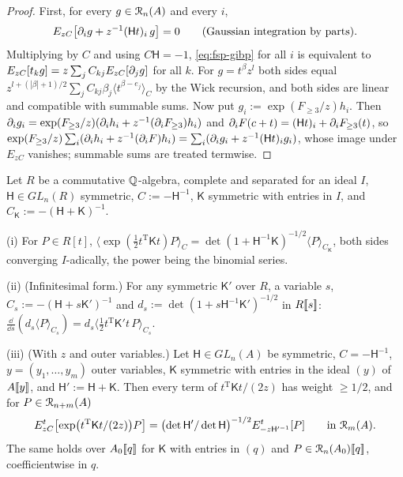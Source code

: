 \begin{proof}
First, for every $g\in\mathcal{R}_n(A)$ and every $i$,
\begin{equation}
\label{eq:fsp-gibp}
E_{zC}\bigl[\partial_ig+z^{-1}(\mathsf Ht)_i\,g\bigr]=0\qquad\text{(Gaussian integration by parts).}
\end{equation}
Multiplying by $C$ and using $C\mathsf H=-1$, \eqref{eq:fsp-gibp} for all $i$ is equivalent to $E_{zC}[t_kg]=z\sum_jC_{kj}E_{zC}[\partial_jg]$ for all $k$. For $g=t^\beta z^l$ both sides equal $z^{l+(|\beta|+1)/2}\sum_jC_{kj}\beta_j\langle t^{\beta-e_j}\rangle_C$ by the Wick recursion, and both sides are linear and compatible with summable sums. Now put $g_i:=\exp(F_{\geq3}/z)h_i$. Then $\partial_ig_i=\exp(F_{\geq3}/z)(\partial_ih_i+z^{-1}(\partial_iF_{\geq3})h_i)$ and $\partial_iF(c+t)=(\mathsf Ht)_i+\partial_iF_{\geq3}(t)$, so $\exp(F_{\geq3}/z)\sum_i(\partial_ih_i+z^{-1}(\partial_iF)h_i)=\sum_i(\partial_ig_i+z^{-1}(\mathsf Ht)_ig_i)$, whose image under $E_{zC}$ vanishes; summable sums are treated termwise.
\end{proof}

\begin{lem}
\label{lem:fsp-pg}
Let $R$ be a commutative $\mathbb{Q}$-algebra, complete and separated for an ideal $I$, $\mathsf H\in GL_n(R)$ symmetric, $C:=-\mathsf H^{-1}$, $\mathsf K$ symmetric with entries in $I$, and $C_{\mathsf K}:=-(\mathsf H+\mathsf K)^{-1}$.

(i) For $P\in R[t]$, $\langle\exp(\frac12t^{\mathrm T}\mathsf Kt)P\rangle_C=\det(1+\mathsf H^{-1}\mathsf K)^{-1/2}\langle P\rangle_{C_{\mathsf K}}$, both sides converging $I$-adically, the power being the binomial series.

(ii) (Infinitesimal form.) For any symmetric $\mathsf K'$ over $R$, a variable $s$, $C_s:=-(\mathsf H+s\mathsf K')^{-1}$ and $d_s:=\det(1+s\mathsf H^{-1}\mathsf K')^{-1/2}$ in $R[\![ s ]\!]$: $\frac{\dd}{\dd s}(d_s\langle P\rangle_{C_s})=d_s\langle\frac12t^{\mathrm T}\mathsf K't\,P\rangle_{C_s}$.

(iii) (With $z$ and outer variables.) Let $\mathsf H\in GL_n(A)$ be symmetric, $C=-\mathsf H^{-1}$, $y=(y_1,\dots,y_m)$ outer variables, $\mathsf K$ symmetric with entries in the ideal $(y)$ of $A[\![ y ]\!]$, and $\mathsf H':=\mathsf H+\mathsf K$. Then every term of $t^{\mathrm T}\mathsf Kt/(2z)$ has weight $\geq1/2$, and for $P\in\mathcal{R}_{n+m}(A)$
\[
E^t_{zC}\bigl[\exp\bigl(t^{\mathrm T}\mathsf Kt/(2z)\bigr)P\bigr]=\bigl(\det\mathsf H'/\det\mathsf H\bigr)^{-1/2}E^t_{-z\mathsf H'^{-1}}[P]\qquad\text{in }\mathcal{R}_m(A).
\]
The same holds over $A_0[\![ q ]\!]$ for $\mathsf K$ with entries in $(q)$ and $P\in\mathcal{R}_n(A_0)[\![ q ]\!]$, coefficientwise in $q$.
\end{lem}

